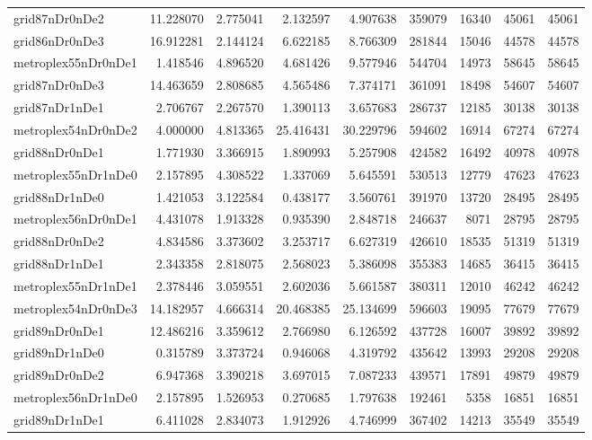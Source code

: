 \begin{longtable}{|l|r|r|r|r|r|r|r|r|}
grid87nDr0nDe2 & 11.228070 & 2.775041 & 2.132597 & 4.907638 & 359079 & 16340 & 45061 & 45061 \\
grid86nDr0nDe3 & 16.912281 & 2.144124 & 6.622185 & 8.766309 & 281844 & 15046 & 44578 & 44578 \\
metroplex55nDr0nDe1 & 1.418546 & 4.896520 & 4.681426 & 9.577946 & 544704 & 14973 & 58645 & 58645 \\
grid87nDr0nDe3 & 14.463659 & 2.808685 & 4.565486 & 7.374171 & 361091 & 18498 & 54607 & 54607 \\
grid87nDr1nDe1 & 2.706767 & 2.267570 & 1.390113 & 3.657683 & 286737 & 12185 & 30138 & 30138 \\
metroplex54nDr0nDe2 & 4.000000 & 4.813365 & 25.416431 & 30.229796 & 594602 & 16914 & 67274 & 67274 \\
grid88nDr0nDe1 & 1.771930 & 3.366915 & 1.890993 & 5.257908 & 424582 & 16492 & 40978 & 40978 \\
metroplex55nDr1nDe0 & 2.157895 & 4.308522 & 1.337069 & 5.645591 & 530513 & 12779 & 47623 & 47623 \\
grid88nDr1nDe0 & 1.421053 & 3.122584 & 0.438177 & 3.560761 & 391970 & 13720 & 28495 & 28495 \\
metroplex56nDr0nDe1 & 4.431078 & 1.913328 & 0.935390 & 2.848718 & 246637 & 8071 & 28795 & 28795 \\
grid88nDr0nDe2 & 4.834586 & 3.373602 & 3.253717 & 6.627319 & 426610 & 18535 & 51319 & 51319 \\
grid88nDr1nDe1 & 2.343358 & 2.818075 & 2.568023 & 5.386098 & 355383 & 14685 & 36415 & 36415 \\
metroplex55nDr1nDe1 & 2.378446 & 3.059551 & 2.602036 & 5.661587 & 380311 & 12010 & 46242 & 46242 \\
metroplex54nDr0nDe3 & 14.182957 & 4.666314 & 20.468385 & 25.134699 & 596603 & 19095 & 77679 & 77679 \\
grid89nDr0nDe1 & 12.486216 & 3.359612 & 2.766980 & 6.126592 & 437728 & 16007 & 39892 & 39892 \\
grid89nDr1nDe0 & 0.315789 & 3.373724 & 0.946068 & 4.319792 & 435642 & 13993 & 29208 & 29208 \\
grid89nDr0nDe2 & 6.947368 & 3.390218 & 3.697015 & 7.087233 & 439571 & 17891 & 49879 & 49879 \\
metroplex56nDr1nDe0 & 2.157895 & 1.526953 & 0.270685 & 1.797638 & 192461 & 5358 & 16851 & 16851 \\
grid89nDr1nDe1 & 6.411028 & 2.834073 & 1.912926 & 4.746999 & 367402 & 14213 & 35549 & 35549 \\

\end{longtable}

